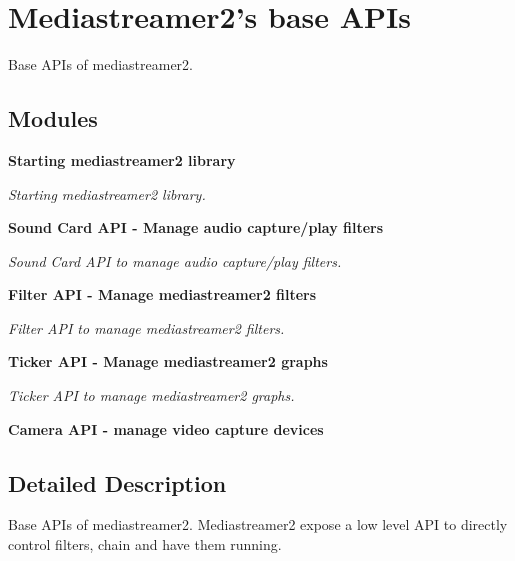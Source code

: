 \section{Mediastreamer2's base APIs}
\label{group__mediastreamer2__api}


Base APIs of mediastreamer2.  
\subsection*{Modules}
\begin{DoxyCompactItemize}
\item 
{\bf Starting mediastreamer2 library}


\begin{DoxyCompactList}\small\item\em Starting mediastreamer2 library. \item\end{DoxyCompactList}\item 
{\bf Sound Card API -\/ Manage audio capture/play filters}


\begin{DoxyCompactList}\small\item\em Sound Card API to manage audio capture/play filters. \item\end{DoxyCompactList}\item 
{\bf Filter API -\/ Manage mediastreamer2 filters}


\begin{DoxyCompactList}\small\item\em Filter API to manage mediastreamer2 filters. \item\end{DoxyCompactList}\item 
{\bf Ticker API -\/ Manage mediastreamer2 graphs}


\begin{DoxyCompactList}\small\item\em Ticker API to manage mediastreamer2 graphs. \item\end{DoxyCompactList}\item 
{\bf Camera API -\/ manage video capture devices}
\end{DoxyCompactItemize}


\subsection{Detailed Description}
Base APIs of mediastreamer2. Mediastreamer2 expose a low level API to directly control filters, chain and have them running. 